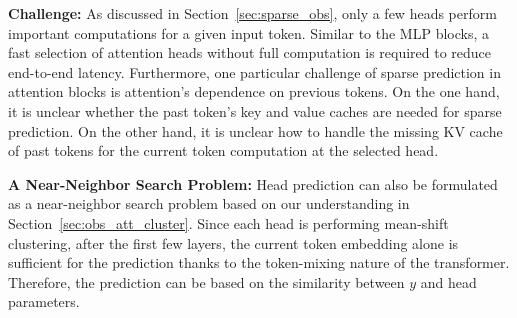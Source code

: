 
\textbf{Challenge:} As discussed in Section~\ref{sec:sparse_obs}, only a few heads perform important computations for a given input token. Similar to the MLP blocks, a fast selection of attention heads without full computation is required to reduce end-to-end latency. Furthermore, one particular challenge of sparse prediction in attention blocks is attention's dependence on previous tokens. On the one hand, it is unclear whether the past token's key and value caches are needed for sparse prediction. On the other hand, it is unclear how to handle the missing KV cache of past tokens for the current token computation at the selected head.

\textbf{A Near-Neighbor Search Problem:} Head prediction can also be formulated as a near-neighbor search problem based on our understanding in Section~\ref{sec:obs_att_cluster}. Since each head is performing mean-shift clustering, after the first few layers, the current token embedding alone is sufficient for the prediction thanks to the token-mixing nature of the transformer. Therefore, the prediction can be based on the similarity between $y$ and head parameters. 

